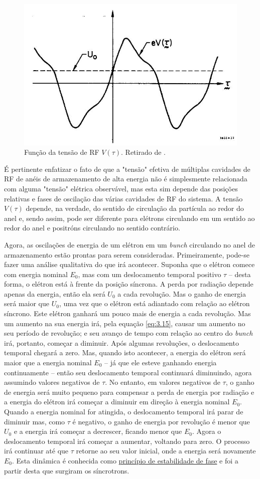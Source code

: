 \begin{figure}[!htb]
	\centering
	\includegraphics[width=0.6\linewidth]{./Figuras/fig33.jpeg}
	\caption{Função da tensão de RF $V(\tau)$. Retirado de \cite{sands1970physics}.}
	\label{fig:fig33}
\end{figure}

É pertinente enfatizar o fato de que a "tensão" efetiva de múltiplas cavidades de RF de anéis de armazenamento de alta energia não é simplesmente relacionada com alguma "tensão" elétrica observável, mas esta sim depende das posições relativas e fases de oscilação das várias cavidades de RF do sistema. A tensão $V(\tau)$ depende, na verdade, do sentido de circulação da partícula ao redor do anel e, sendo assim, pode ser diferente para elétrons circulando em um sentido ao redor do anel e positróns circulando no sentido contrário.

Agora, as oscilações de energia de um elétron em um \textit{bunch} circulando no anel de armazenamento estão prontas para serem consideradas. Primeiramente, pode-se fazer uma análise qualitativa do que irá acontecer. Suponha que o elétron comece com energia nominal $E_0$, mas com um deslocamento temporal positivo $\tau$ -- desta forma, o elétron está à frente da posição síncrona. A perda por radiação depende apenas da energia, então ela será $U_0$ a cada revolução. Mas o ganho de energia será maior que $U_0$, uma vez que o elétron está adiantado com relação ao elétron síncrono. Este elétron ganhará um pouco mais de energia a cada revolução. Mas um aumento na sua energia irá, pela equação \eqref{eq:3.15}, causar um aumento no seu período de revolução; e seu avanço de tempo com relação ao centro do \textit{bunch} irá, portanto, começar a diminuir. Após algumas revoluções, o deslocamento temporal chegará a zero. Mas, quando isto acontecer, a energia do elétron será maior que a energia nominal $E_0$ -- já que ele esteve ganhando energia continuamente -- então seu deslocamento temporal continuará diminuindo, agora assumindo valores negativos de $\tau$. No entanto, em valores negativos de $\tau$, o ganho de energia será muito pequeno para compensar a perda de energia por radiação e a energia do elétron irá começar a diminuir em direção à energia nominal $E_0$. Quando a energia nominal for atingida, o deslocamento temporal irá parar de diminuir mas, como $\tau$ é negativo, o ganho de energia por revolução é menor que $U_0$ e a energia irá começar a decrescer, ficando menor que $E_0$. Agora o deslocamento temporal irá começar a aumentar, voltando para zero. O processo irá continuar até que $\tau$ retorne ao seu valor inicial, onde a energia será novamente $E_0$. Esta dinâmica é conhecida como \uline{princípio de estabilidade de fase} e foi a partir desta que surgiram os síncrotrons.

